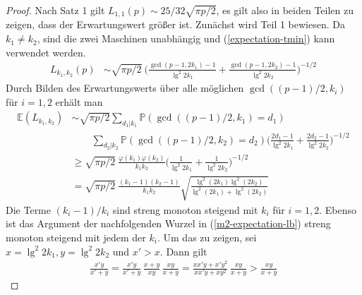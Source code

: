 \documentclass[a4paper, 10pt, ngerman]{article}
\newcommand{\E}{\mathbb{E}}
\renewcommand{\P}{\mathbb{P}}
\begin{document}
\begin{proof}
    Nach Satz 1 gilt $L_{1, 1}(p) \sim 25/32 \sqrt{\pi p /2}$, es gilt also in beiden Teilen zu zeigen, dass der Erwartungswert größer ist. Zunächst wird Teil 1 bewiesen. Da $k_1 \ne k_2$, sind die zwei Maschinen unabhängig und (\ref{expectation-tmin}) kann verwendet werden.
    \begin{align*}
        L_{k_1, k_2}(p)
         & \sim \sqrt{\pi p / 2} \
        \Bigg ( \frac {\gcd(p - 1, 2k_1) - 1} {\lg^2 2k_1} +
        \frac {\gcd(p -1, 2k_2) - 1} {\lg^2 2k_2} \Bigg )^{-1/2}
    \end{align*}
    Durch Bilden des Erwartungswerts über alle möglichen $\gcd((p - 1)/2, k_i)$ für $i = 1, 2$ erhält man
    \begin{align}
        \E(L_{k_1, k_2})
         & \sim \sqrt{\pi p / 2}
        \sum_{d_1 | k_1} \P(\gcd((p - 1)/2, k_1) = d_1)
        \nonumber                                                 \\
         & \qquad \sum_{d_2 | k_2} \P(\gcd((p - 1)/2, k_2) = d_2)
        \Bigg ( \frac {2d_1 - 1} {\lg^2 2k_1}
        + \frac {2d_2 - 1} {\lg^2 2k_2} \Bigg )^{-1/2}
        \nonumber                                                 \\
         & \ge \sqrt{\pi p / 2} \
        \frac {\varphi(k_1) \varphi(k_2)} {k_1k_2}
        \Bigg (\frac 1 {\lg^2 2k_1} + \frac 1 {\lg^2 2k_2} \Bigg )^{-1/2}
        \nonumber                                                 \\
         & = \sqrt{\pi p / 2} \
        \frac {(k_1 - 1) (k_2- 1)} {k_1k_2}
        \sqrt{\frac{\lg^2(2k_1) \lg^2(2k_2)}{\lg^2(2k_1) + \lg^2(2k_2)}}
        \label{m2-expectation-lb}
    \end{align}
    Die Terme $(k_i - 1)/k_i$ sind streng monoton steigend mit $k_i$ für $i = 1, 2$. Ebenso ist das Argument der nachfolgenden Wurzel in (\ref{m2-expectation-lb}) streng monoton steigend mit jedem der $k_i$. Um das zu zeigen, sei $x = \lg^2 2k_1, y = \lg^2 2k_2$ und $x' > x$. Dann gilt
    \begin{align*}
        \frac {x'y} {x' + y}
        = \frac {x'y} {x' + y} \, \frac {x + y} {xy} \, \frac {xy} {x + y}
        = \frac {xx'y + x'y^2} {xx'y + xy^2} \, \frac {xy} {x + y}
        > \frac {xy} {x + y}
    \end{align*}

\end{proof}
\end{document}
